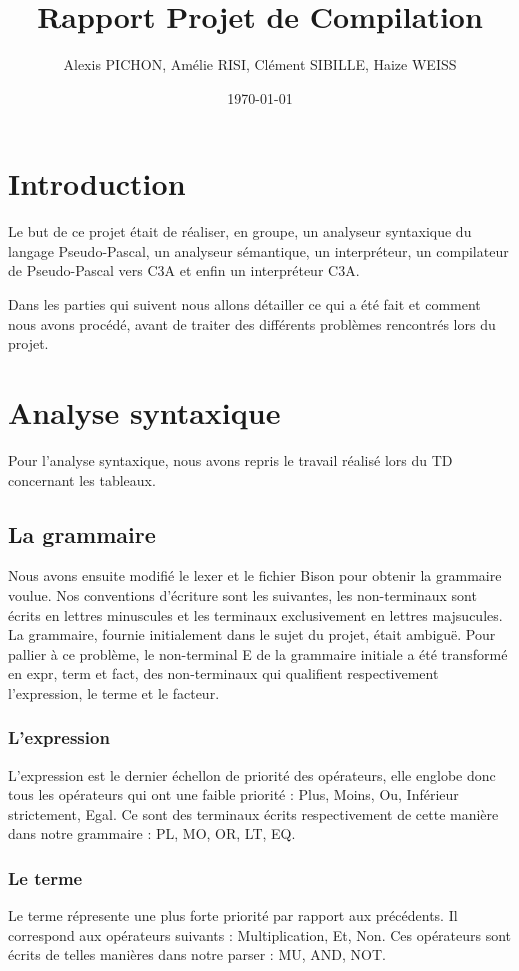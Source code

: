 \documentclass[11pt,a4paper]{article}
\title{Rapport Projet de Compilation}
\author{Alexis PICHON, Amélie RISI, Clément SIBILLE, Haize WEISS}
\date{\today}
\begin{document}
\maketitle
\pagebreak
\tableofcontents
\pagebreak

\setlength{\parskip}{1em}
\setlength{\intextsep}{2em}


\section{Introduction}
Le but de ce projet était de réaliser, en groupe, un analyseur syntaxique du langage Pseudo-Pascal, un analyseur sémantique, un interpréteur, un compilateur de Pseudo-Pascal vers C3A et enfin un interpréteur C3A.
\par
Dans les parties qui suivent nous allons détailler ce qui a été fait et comment nous avons procédé, avant de traiter des différents problèmes rencontrés lors du projet.




\section{Analyse syntaxique}
Pour l'analyse syntaxique, nous avons repris le travail réalisé lors du TD concernant les tableaux. 

\subsection{La grammaire}
Nous avons ensuite modifié le lexer et le fichier Bison pour obtenir la grammaire voulue. Nos conventions d'écriture sont les suivantes, les non-terminaux sont écrits en lettres minuscules et les terminaux exclusivement en lettres majsucules. 
La grammaire, fournie initialement dans le sujet du projet, était ambiguë. Pour pallier à ce problème, le non-terminal E de la grammaire initiale a été transformé en expr, term et fact, des non-terminaux qui qualifient respectivement l'expression, le terme et le facteur. 
\subsubsection{L'expression}
L'expression est le dernier échellon de priorité des opérateurs, elle englobe donc tous les opérateurs qui ont une faible priorité : Plus, Moins, Ou, Inférieur strictement, Egal. 
Ce sont des terminaux écrits respectivement de cette manière dans notre grammaire : PL, MO, OR, LT, EQ.
\subsubsection{Le terme}
Le terme répresente une plus forte priorité par rapport aux précédents. Il correspond aux opérateurs suivants : Multiplication, Et, Non.
Ces opérateurs sont écrits de telles manières dans notre parser : MU, AND, NOT.  
\end{document}
